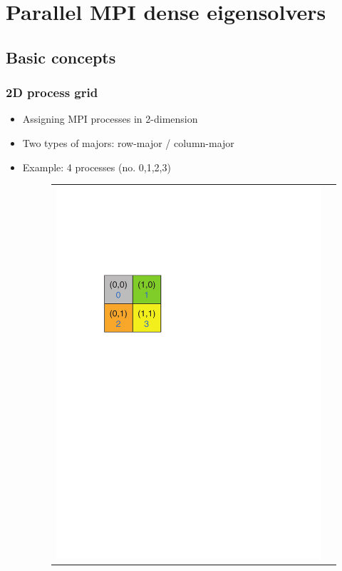 \section{Parallel MPI dense eigensolvers}

\subsection{Basic concepts}

\begin{frame}
  \frametitle{2D process grid}
  \begin{itemize}
  \item Assigning MPI processes in 2-dimension
  \item Two types of majors: row-major / column-major
  \item Example: 4 processes (no. {\color{blue}0,1,2,3})
  \begin{figure}[htbp]
\begin{tabular}{cc}
\begin{minipage}{0.4\hsize}
\begin{center}
\includegraphics[height=0.25\textheight]{figure/grid-row-major.pdf}

\end{center}
\end{minipage}
\end{tabular}
\end{figure}
\end{itemize}
\end{frame}
